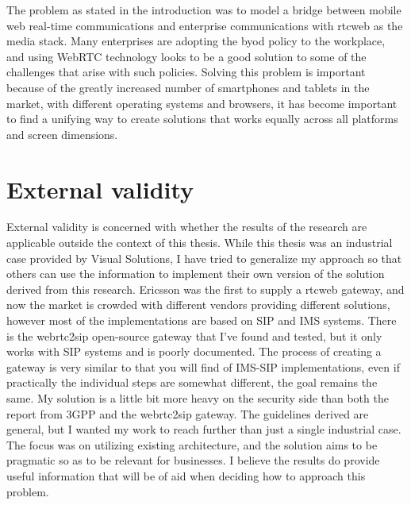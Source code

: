 

The problem as stated in the introduction was to model a bridge between mobile web real-time communications and enterprise communications with \gls{rtcweb} as the media stack. Many enterprises are adopting the \gls{byod} policy to the workplace, and using WebRTC technology looks to be a good solution to some of the challenges that arise with such policies. Solving this problem is important because of the greatly increased number of smartphones and tablets in the market, with different operating systems and browsers, it has become important to find a unifying way to create solutions that works equally across all platforms and screen dimensions.


\section{External validity}
External validity is concerned with whether the results of the research are applicable outside the context of this thesis. While this thesis was an industrial case provided by Visual Solutions, I have tried to generalize my approach so that others can use the information to implement their own version of the solution derived from this research. Ericsson was the first to supply a \gls{rtcweb} gateway, and now the market is crowded with different vendors providing different solutions, however most of the implementations are based on SIP and IMS systems. There is the webrtc2sip open-source gateway that I've found and tested, but it only works with SIP systems and is poorly documented. The process of creating a gateway is very similar to that you will find of IMS-SIP implementations, even if practically the individual steps are somewhat different, the goal remains the same. My solution is a little bit more heavy on the security side than both the report from 3GPP\cite{3gpp-wrtc-access-ims} and the webrtc2sip gateway. The guidelines derived are general, but I wanted my work to reach further than just a single industrial case. The focus was on utilizing existing architecture, and the solution aims to be pragmatic so as to be relevant for businesses. I believe the results do provide useful information that will be of aid when deciding how to approach this problem.

